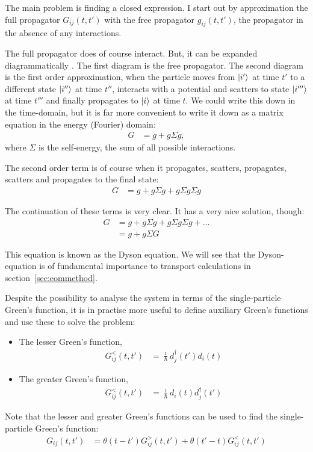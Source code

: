 The main problem is finding a closed expression. I start out by approximation the full propagator $G_{ij}(t,t')$ with the free propagator $g_{ij}(t,t')$, the propagator in the absence of any interactions. 

The full propagator does of course interact. But, it can be expanded diagrammatically \cite{mattuck}. The first diagram is the free propagator. The second diagram is the first order approximation, when the particle moves from $\ket{i'}$ at time $t'$ to a different state $\ket{i''}$ at time $t''$, interacts with a potential and scatters to state $\ket{i'''}$ at time $t'''$ and finally propagates to $\ket{i}$ at time $t$. We could write this down in the time-domain, but it is far more convenient to write it down as a matrix equation in the energy (Fourier) domain:
\begin{align*}
G &= g + g \Sigma g,
\end{align*}
where $\Sigma$ is the self-energy, the sum of all possible interactions.

The second order term is of course when it propagates, scatters, propagates, scatters and propagates to the final state:
\begin{align*}
G &= g + g \Sigma g + g \Sigma g \Sigma g
\end{align*}

The continuation of these terms is very clear. It has a very nice solution, though:
\begin{align}
G &= g + g \Sigma g + g \Sigma g \Sigma g+ \ldots \nonumber\\
&= g + g \Sigma G \label{eq:dyson}
\end{align}

This equation is known as the Dyson equation. We will see that the Dyson-equation is of fundamental importance to transport calculations in section~\ref{sec:eommethod}.

Despite the possibility to analyse the system in terms of the single-particle Green's function, it is in practise more useful to define auxiliary Green's functions and use these to solve the problem:
\begin{itemize}
\item The lesser Green's function, 
\begin{align*}
G^<_{ij}(t,t') &= \frac{\imath}{\hbar}d^\dagger_j(t')d_i(t)
\end{align*}
\item The greater Green's function, 
\begin{align*}
G^<_{ij}(t,t') &= \frac{\imath}{\hbar}d_i(t)d^\dagger_j(t')
\end{align*}
\end{itemize}
Note that the lesser and greater Green's functions can be used to find the single-particle Green's function:
\begin{align*}
G_{ij}(t,t') &= \theta(t-t')G^>_{ij} (t,t') + \theta(t'-t) G_{ij}^<(t,t')
\end{align*}

